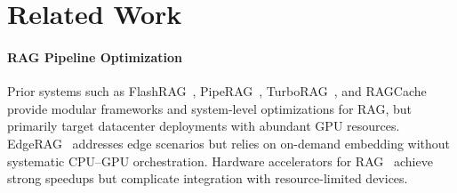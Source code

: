 

\section{Related Work}
\label{sec:related_works}

\paragraph{RAG Pipeline Optimization}
Prior systems such as FlashRAG~\cite{jin2024flashrag}, PipeRAG~\cite{jiang2024piperag}, TurboRAG~\cite{lu2024turborag}, and RAGCache~\cite{ragcacheefficientknowledgecaching} provide modular frameworks and system-level optimizations for RAG, but primarily target datacenter deployments with abundant GPU resources. EdgeRAG~\cite{EdgeRAG} addresses edge scenarios but relies on on-demand embedding without systematic CPU--GPU orchestration. Hardware accelerators for RAG~\cite{jiang2023chameleon, qin2024robust, reis, HETERag} achieve strong speedups but complicate integration with resource-limited devices.

